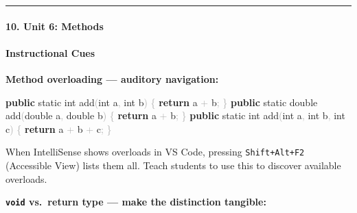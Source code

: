 \documentclass[
  justified,
  openright,
]{tufte-book}
\let\subsection\paragraph
\let\paragraph\paragraph
\newcommand{\KeywordTok}[1]{\textcolor{CodeKeyword}{\textbf{#1}}}  %
\newcommand{\CodeFuncTok}[1]{\textcolor{CodeKeyword}{#1}}           %
\newcommand{\CodeTypeTok}[1]{\textcolor{CodeType}{#1}}              %
\newcommand{\OperatorTok}[1]{\textcolor{DarkGray}{#1}}              %
\newenvironment{Shaded}{%
  \begin{mdframed}[style=TufteCode]%
}{%
  \end{mdframed}%
}
\let\subsection\paragraph
\let\paragraph\paragraph
\begin{document}
\begin{center}\rule{0.5\linewidth}{0.5pt}\end{center}

\subsection{10. Unit 6: Methods}\label{unit-6-methods}

\paragraph{Instructional Cues}\label{instructional-cues-29}

\textbf{Method overloading --- auditory navigation:}

\begin{Shaded}
\begin{Highlighting}[]
\KeywordTok{public} \CodeTypeTok{static} \CodeTypeTok{int} \CodeFuncTok{add}\OperatorTok{(}\CodeTypeTok{int} a\OperatorTok{,} \CodeTypeTok{int} b\OperatorTok{)} \OperatorTok{\{} \KeywordTok{return} a \OperatorTok{+} b\OperatorTok{;} \OperatorTok{\}}
\KeywordTok{public} \CodeTypeTok{static} \CodeTypeTok{double} \CodeFuncTok{add}\OperatorTok{(}\CodeTypeTok{double} a\OperatorTok{,} \CodeTypeTok{double} b\OperatorTok{)} \OperatorTok{\{} \KeywordTok{return} a \OperatorTok{+} b\OperatorTok{;} \OperatorTok{\}}
\KeywordTok{public} \CodeTypeTok{static} \CodeTypeTok{int} \CodeFuncTok{add}\OperatorTok{(}\CodeTypeTok{int} a\OperatorTok{,} \CodeTypeTok{int} b\OperatorTok{,} \CodeTypeTok{int} c\OperatorTok{)} \OperatorTok{\{} \KeywordTok{return} a \OperatorTok{+} b \OperatorTok{+} c\OperatorTok{;} \OperatorTok{\}}
\end{Highlighting}
\end{Shaded}

When IntelliSense shows overloads in VS Code, pressing
\texttt{Shift+Alt+F2} (Accessible View) lists them all. Teach students
to use this to discover available overloads.

\textbf{\texttt{void} vs.~return type --- make the distinction
tangible:}
\end{document}
